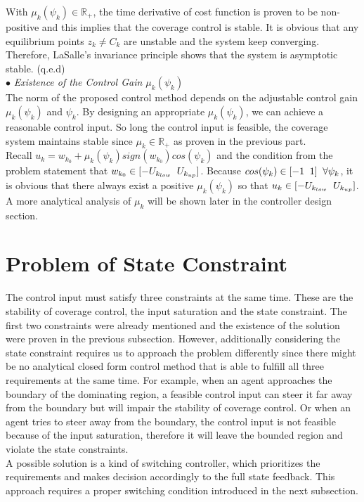 \noindent With  ${\mu_k(\psi_{k}) \in \mathbb{R}_+}$, the time derivative of cost function is proven to be non-positive and this implies that the coverage control is stable. It is obvious that any equilibrium points ${z_k \neq C_k}$ are unstable and the system keep converging. Therefore, LaSalle's invariance principle shows that the system is asymptotic stable. (q.e.d)\\

\noindent $\bullet$ \textit{Existence of the Control Gain ${\mu_k(\psi_k)}$} \\
The norm of the proposed control method depends on the adjustable control gain ${\mu_{k}(\psi_{k})}$ and ${\psi_{k}}$. By designing an appropriate ${\mu_k(\psi_{k})}$, we can achieve a reasonable control input. So long the control input is feasible, the coverage system maintains stable since ${\mu_{k} \in \mathbb{R}_+}$ as proven in the previous part. \\
Recall ${u_{k} = w_{k_0} + \mu_k(\psi_{k})sign(w_{k_0})cos(\psi_{k})}$ and the condition from the problem statement that ${w_{k_0} \in [-U_{k_{low}} \txtspc{ }U_{k_{up}}]}$. Because  ${cos(\psi_{k}) \in [-1 \txtspc{ } 1] \txtspc{ } \forall \psi_{k}}$, it is obvious that there always exist a positive ${\mu_k(\psi_{k})}$ so that ${u_k \in [-U_{k_{low}} \txtspc{ } U_{k_{up}}]}$. A more analytical analysis of ${\mu_k}$ will be shown later in the controller design section.


\section{Problem of State Constraint}
The control input must satisfy three constraints at the same time. These are the stability of coverage control, the input saturation and the state constraint. The first two constraints were already mentioned and the existence of the solution were proven in the previous subsection. However, additionally considering the state constraint requires us to approach the problem differently since there might be no analytical closed form control method that is able to fulfill all three requirements at the same time. For example, when an agent approaches the boundary of the dominating region, a feasible control input can steer it far away from the boundary but will impair the stability of coverage control. Or when an agent tries to steer away from the boundary, the control input is not feasible because of the input saturation, therefore it will leave the bounded region and violate the state constraints.\\
A possible solution is a kind of switching controller, which prioritizes the requirements and makes decision accordingly to the full state feedback. This approach requires a proper switching condition introduced in the next subsection.
